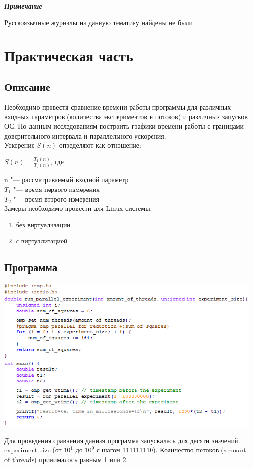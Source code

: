 \documentclass{article}
\begin{document}
\textbf{\textit{Примечание}}

Русскоязычные журналы на данную тематику найдены не были
\newpage
\section{Практическая часть}
	\subsection{Описание}
		Необходимо провести сравнение времени работы программы для различных входных параметров (количества экспериментов и потоков) и различных запусков ОС. По данным исследованиям построить графики времени работы с границами доверительного интервала и параллельного ускорения.\\
		
		Ускорение $S(n)$ определяют как отношение:
		\begin{center}				
			$ S(n) = \frac{T_1(n)}{T_2(n)} $, где 
		\end{center}
				n "--- рассматриваемый входной параметр \\
				$T_1$ "--- время первого измерения\\
				$T_2$ "--- время второго измерения\\
					
		Замеры необходимо провести для Linux-системы:
			\begin{enumerate}
				\item без виртуализации
				\item с виртуализацией
			\end{enumerate}
\newpage
	\subsection{Программа}
		\begin{flushleft} 
			\includegraphics{source.png}
		\end{flushleft}		
		Для проведения сравнения данная программа запускалась для десяти значений experiment$\_$size (от $10^1$ до $10^9$ с шагом 111111110). Количество потоков (amount$\_$of$\_$threads) принималось равным 1 или 2.		
\end{document}
